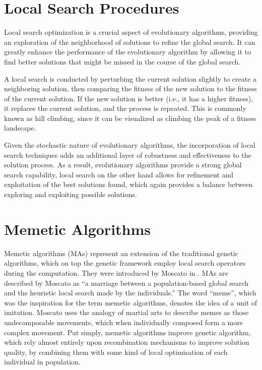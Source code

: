 \documentclass[twoside]{ctuthesis}
\theoremstyle{plain}
\theoremstyle{definition}
\theoremstyle{note}
\begin{document}
\section{Local Search Procedures}
\label{sec:localsearch}
Local search optimization is a crucial aspect of evolutionary algorithms, providing an exploration of the neighborhood of solutions to refine the global search. It can greatly enhance the performance of the evolutionary algorithm by allowing it to find better solutions that might be missed in the course of the global search.

A local search is conducted by perturbing the current solution slightly to create a neighboring solution, then comparing the fitness of the new solution to the fitness of the current solution. If the new solution is better (i.e., it has a higher fitness), it replaces the current solution, and the process is repeated. This is commonly known as hill climbing, since it can be visualized as climbing the peak of a fitness landscape.

Given the stochastic nature of evolutionary algorithms, the incorporation of local search techniques adds an additional layer of robustness and effectiveness to the solution process. As a result, evolutionary algorithms provide a strong global search capability, local search on the other hand allows for refinement and exploitation of the best solutions found, which again provides a balance between exploring and exploiting possible solutions.

\section{Memetic Algorithms}
\label{sec:memetic}
Memetic algorithms (MAs) represent an extension of the traditional genetic algorithms, which on top the genetic framework employ local search operators during the computation. They were introduced by Moscato in \cite{moscato1989evolution}. MAs are described by Moscato as ``a marriage between a population-based global search and the heuristic local search made by the individuals.'' The word ``meme'', which was the inspiration for the term memetic algorithms, denotes the idea of a unit of imitation. Moscato uses the analogy of martial arts to describe memes as those undecomposable movements, which when individually composed form a more complex movement. Put simply, memetic algorithms improve genetic algorithm, which rely almost entirely upon recombination mechanisms to improve solution quality, by combining them with some kind of local optimisation of each individual in population. 
\end{document}
